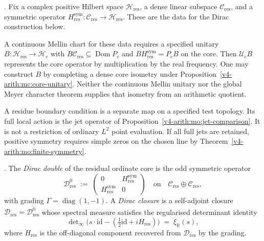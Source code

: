 \begin{definition}
\label{v4-arith:w9-r4:def:residual-ordinate-core}
\ClaimStatusDefinitional. Fix a complex positive Hilbert space
$\mathcal H_{\mathrm{res}}$, a dense linear subspace
$\mathcal C_{\mathrm{res}}$, and a symmetric operator
$H_{\mathrm{res}}^{\mathrm{sym}}:\mathcal C_{\mathrm{res}}
\to\mathcal H_{\mathrm{res}}$.
These are the data for the Dirac construction below.

A continuous Mellin chart for these data requires a specified
unitary $B:\mathcal H_{\mathrm{res}}\to\mathscr H_c$ with
$B\mathcal C_{\mathrm{res}}\subseteq\operatorname{Dom}P_c$ and
$BH_{\mathrm{res}}^{\mathrm{sym}}=P_cB$ on the core.
Then $\mathcal U_cB$ represents the core operator by multiplication
by the real frequency. One may construct $B$ by completing a dense
core isometry under Proposition~\ref{v4-arith:mc:core-unitary}.
Neither the continuous Mellin unitary nor the global Meyer character
theorem supplies that isometry from an arithmetic quotient.

A residue boundary condition is a separate map on a specified
test topology. Its full local action is the jet operator of
Proposition~\ref{v4-arith:mo:jet-comparison}. It is not a restriction
of ordinary $L^2$ point evaluation. If all full jets are retained,
positive symmetry requires simple zeros on the chosen line by
Theorem~\ref{v4-arith:mo:finite-symmetry}.
\end{definition}

\begin{definition}
\label{v4-arith:w9-r4:def:dirac-double}
\ClaimStatusDefinitional. The \emph{Dirac double} of the residual
ordinate core is the odd symmetric operator
\begin{equation}
\label{v4-arith:w9-r4:eq:dirac-double}
\mathscr{D}_{\mathrm{res}}^{0}
\;:=\;
\begin{pmatrix}
0 & H_{\mathrm{res}}^{\mathrm{sym}}\\
H_{\mathrm{res}}^{\mathrm{sym}} & 0
\end{pmatrix}
\quad\text{on}\quad
\mathcal{C}_{\mathrm{res}}\oplus\mathcal{C}_{\mathrm{res}},
\end{equation}
with grading
\(\Gamma=\operatorname{diag}(1,-1)\). A \emph{Dirac closure} is a
self-adjoint closure
\(\mathscr{D}_{\mathrm{res}}=\overline{\mathscr{D}_{\mathrm{res}}^{0}}\)
whose spectral measure satisfies the regularised determinant
identity
\begin{equation}
\label{v4-arith:w9-r4:eq:dirac-det}
\det\nolimits_{\infty}\bigl(s\cdot\mathrm{id}
-({\tfrac12}\mathrm{id}+iH_{\mathrm{res}})\bigr)
\;=\;\xi_{\mathbb{R}}(s),
\end{equation}
where \(H_{\mathrm{res}}\) is the off-diagonal component recovered
from \(\mathscr{D}_{\mathrm{res}}\) by the grading.
\end{definition}

